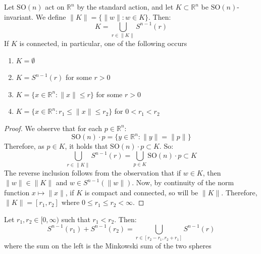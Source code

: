 \begin{lemma}\label{lem:so-invariant-subsets}
Let $\mathrm{SO}(n)$ act on $\mathbb{R}^{n}$ by the standard action, and let $K \subset \mathbb{R}^{n}$ be $\mathrm{SO}(n)$-invariant. We define $\|K\| = \{\|w\|: w \in K \}$.
Then:
\begin{equation}
K = \bigcup_{r \in \|K\|} S^{n-1}(r)
\end{equation}
If $K$ is connected, in particular, one of the following occurs  
\begin{enumerate}
    \item $K = \emptyset$
    \item $K = S^{n-1}(r)$ for some $r > 0$
    \item $K = \{x \in \mathbb{R}^{n}: \|x\| \leq r\}$ for some $r > 0$
    \item $K = \{x \in \mathbb{R}^{n}: r_{1} \leq \|x\| \leq r_{2}\}$ for $0 < r_1 < r_2$
\end{enumerate}
\end{lemma}
\begin{proof}
We observe that for each $p \in \mathbb{R}^{n}$:
\begin{equation}
\mathrm{SO}(n) \cdot p = \{y \in \mathbb{R}^n : \|y\| = \|p\|\}
\end{equation}
Therefore, as $p \in K$, it holds that $\mathrm{SO}(n) \cdot p \subset K$. So:
\begin{equation}
\bigcup_{r \in \|K\|} S^{n-1}(r) = \bigcup_{p \in K} \mathrm{SO}(n) \cdot p \subset K
\end{equation}
The reverse inclusion follows from the observation that if $w \in K$, then $\|w\| \in \|K\|$ and $w \in S^{n-1}(\|w\|)$. Now, by continuity of the norm function $x \mapsto \|x\|$, if $K$ is compact and connected, so will be $\|K\|$. Therefore, $\|K\| = [r_{1}, r_{2}]$ where $0 \leq r_{1} \leq r_{2} < \infty$.
\end{proof}
\begin{theorem}\label{thm:minkowski-sum-spheres}
Let $r_{1}, r_{2} \in [0, \infty)$ such that $r_{1} < r_{2}$. Then:
\begin{equation}
S^{n-1}(r_{1}) + S^{n-1}(r_{2}) = \bigcup_{r \in [r_{2} - r_{1}, r_{2} + r_{1}]} S^{n-1}(r)
\end{equation}
where the sum on the left is the Minkowski sum of the two spheres 
\end{theorem}
